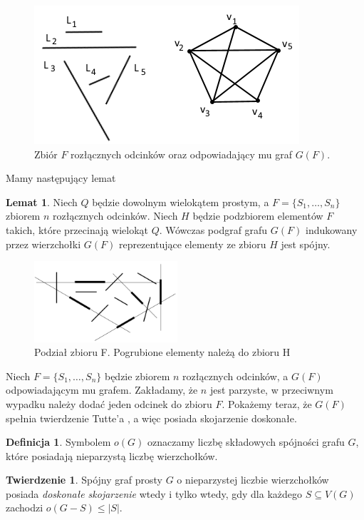 \documentclass[brudnopis]{xmgr}
\theoremstyle{definition}
\newtheorem{Twierdzenie}{Twierdzenie}
\newtheorem{Lemat}{Lemat}
\newtheorem{Definicja}{Definicja}
\begin{document}
\begin{figure}[ht!]
 \centering
  \includegraphics{rysunki/g_f.png}
  \caption{Zbiór $F$ rozłącznych odcinków oraz odpowiadający mu graf $G(F)$.}
  \label{fig:zbior odcinkow rozlacznych}
\end{figure} 

Mamy następujący lemat
\begin{Lemat}\label{podgraf indukowany} \cite{illumination}
Niech $Q$ będzie dowolnym wielokątem prostym, a $F = \{S_1,\ldots,S_n\}$ zbiorem $n$ rozłącznych odcinków. Niech $H$ będzie podzbiorem elementów $F$ takich, które przecinają wielokąt $Q$. Wówczas podgraf grafu $G(F)$ indukowany przez wierzchołki $G(F)$ reprezentujące elementy ze zbioru $H$ jest spójny.
\end{Lemat}
\begin{figure}[ht!]
 \centering
  \includegraphics[height=3cm]{rysunki/podzial_h.png}
  \caption{Podział zbioru F. Pogrubione elementy należą do zbioru H}
\end{figure} 
Niech $F = \{S_1,\ldots,S_n\}$ będzie zbiorem $n$ rozłącznych odcinków, a $G(F)$ odpowiadającym mu grafem. Zakładamy, że $n$ jest parzyste, w przeciwnym wypadku należy dodać jeden odcinek do zbioru $F$. Pokażemy teraz, że $G(F)$ spełnia twierdzenie Tutte'a \cite{tutte}, a więc posiada skojarzenie doskonałe.
\begin{Definicja}
	Symbolem $o(G)$ oznaczamy liczbę składowych spójności grafu $G$, które posiadają nieparzystą liczbę wierzchołków.
\end{Definicja}
\begin{Twierdzenie} \cite{tutte}
	Spójny graf prosty $G$ o nieparzystej liczbie wierzchołków posiada \emph{doskonałe skojarzenie} wtedy i tylko wtedy, gdy dla każdego $S \subseteq V(G)$ zachodzi $o(G-S) \le |S|$.
\end{Twierdzenie}
\end{document}

